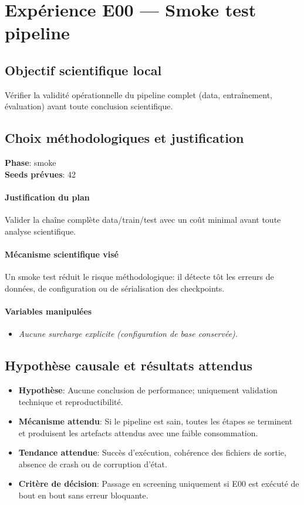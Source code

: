 \documentclass[11pt,a4paper]{article}
\begin{document}
\section{Expérience E00 --- Smoke test pipeline}
\subsection{Objectif scientifique local}
Vérifier la validité opérationnelle du pipeline complet (data, entraînement, évaluation) avant toute conclusion scientifique.

\subsection{Choix méthodologiques et justification}
\textbf{Phase}: smoke\\
\textbf{Seeds prévues}: 42\\


\paragraph{Justification du plan}
Valider la chaîne complète data/train/test avec un coût minimal avant toute analyse scientifique.

\paragraph{Mécanisme scientifique visé}
Un smoke test réduit le risque méthodologique: il détecte tôt les erreurs de données, de configuration ou de sérialisation des checkpoints.

\paragraph{Variables manipulées}
\begin{itemize}
\item \textit{Aucune surcharge explicite (configuration de base conservée).}
\end{itemize}

\subsection{Hypothèse causale et résultats attendus}
\begin{itemize}[leftmargin=1.2cm]
\item \textbf{Hypothèse}: Aucune conclusion de performance; uniquement validation technique et reproductibilité.
\item \textbf{Mécanisme attendu}: Si le pipeline est sain, toutes les étapes se terminent et produisent les artefacts attendus avec une faible consommation.
\item \textbf{Tendance attendue}: Succès d'exécution, cohérence des fichiers de sortie, absence de crash ou de corruption d'état.
\item \textbf{Critère de décision}: Passage en screening uniquement si E00 est exécuté de bout en bout sans erreur bloquante.
\end{itemize}
\end{document}
